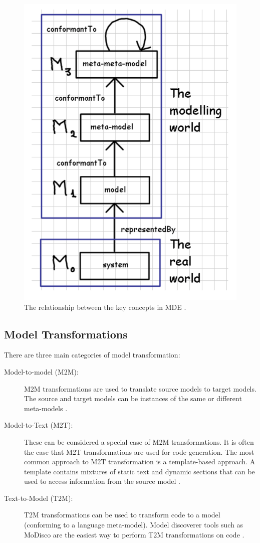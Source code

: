 \documentclass{UoYCSproject}
\begin{document}
\begin{figure}[h!]
  \centering
  \includegraphics[width=0.5\linewidth]{graphics/metamodel_terminology.png}
  \caption{The relationship between the key concepts in MDE \parencite{bezivin2004search}.}
  \label{fig:metamodel_term}
\end{figure}


\subsection{Model Transformations}
There are three main categories of model transformation:
\begin{description}
\item[Model-to-model (M2M):] M2M transformations are used to translate source models to target models. The source and target models can be instances of the same or different meta-models \parencite{czarnecki2003classification}.
\item[Model-to-Text (M2T):] These can be considered a special case of M2M transformations. It is often the case that M2T transformations are used for code generation. The most common approach to M2T transformation is a template-based approach. A template contains mixtures of static text and dynamic sections that can be used to access information from the source model \parencite{czarnecki2003classification}.
\item[Text-to-Model (T2M):]  T2M transformations can be used to transform code to a model (conforming to a language meta-model). Model discoverer tools such as MoDisco \parencite{bruneliere2014modisco} are the easiest way to perform T2M transformations on code \parencite{kowalczyk2009model}.
\end{description}
\end{document}

